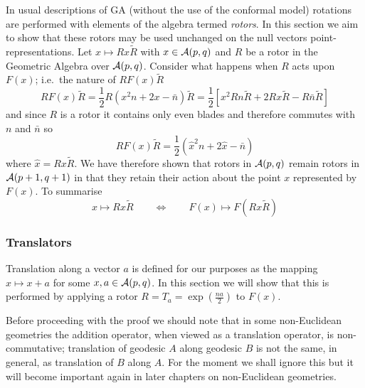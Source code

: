 In usual descriptions of GA (without the use of the conformal model)
rotations are performed with elements of the algebra termed
\emph{rotors}. In this section we aim to show that these rotors may be used
unchanged on the null vectors point-representations.
Let $x \mapsto Rx\tilde{R}$ with $x\in {\mathcal{A}}(p,q)$ and $R$ be a
rotor in the Geometric Algebra over ${\mathcal{A}}(p,q)$. Consider
what happens when $R$ acts upon $F(x)$; i.e.\ the nature of
$RF(x)\tilde{R}$
%
\[ RF(x)\tilde{R} =\frac{1}{2} R(x^2n + 2x - \bar{n})\tilde{R} =\frac{1}{2}[ x^2Rn\tilde{R}
+ 2Rx\tilde{R} - R\bar{n}\tilde{R}] \]
%
and since $R$ is a rotor it contains only even blades and therefore 
commutes with
$n$ and $\bar{n}$  
so
%
\begin{equation} RF(x)\tilde{R} = \frac{1}{2}(\hat{x}^2n + 2\hat{x} - \bar{n})
	\end{equation}
%
where $\hat{x}=R x \tilde{R}$. We have therefore shown that rotors in
${\mathcal{A}}(p,q)$ remain rotors in ${\mathcal{A}}(p+1,q+1)$ in that they retain
their action about the point $x$ represented by $F(x)$. To summarise
%
\begin{equation} x \mapsto Rx\tilde{R} \qquad \Leftrightarrow \qquad F(x) \mapsto
F(Rx\tilde{R}) \end{equation}
%

\subsubsection{Translators}

Translation along a vector $a$ is defined for our purposes as the
mapping $x\mapsto x+a$ for some $x,a \in \mathcal{A}(p,q)$.
In this
section we will show that this is performed by applying a 
rotor $R=T_a = \exp\left({\frac{na}{2}}\right)$ to $F(x)$.

Before proceeding with the proof we should note that in some non-Euclidean
geometries the addition operator, when viewed as a translation operator, is
non-commutative; translation of geodesic $A$ along geodesic $B$ is not the
same, in general, as translation of $B$ along $A$. For the moment we shall
ignore this but it will become important again in later chapters on 
non-Euclidean geometries.

